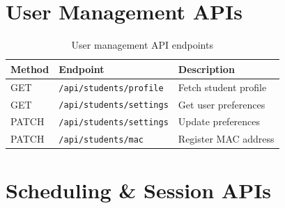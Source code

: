 \section{User Management APIs}

\begin{table}[!ht]
    \centering
    \begin{tabular}{|l|l|p{6.5cm}|}
    \hline
    \textbf{Method} & \textbf{Endpoint} & \textbf{Description} \\ \hline
    GET   & \texttt{/api/students/profile}  & Fetch student profile \\
    GET   & \texttt{/api/students/settings} & Get user preferences \\
    PATCH & \texttt{/api/students/settings} & Update preferences \\
    PATCH & \texttt{/api/students/mac}      & Register MAC address \\ \hline
    \end{tabular}
    \caption{User management API endpoints}
    \label{tab:api_user}
\end{table}

\section{Scheduling \& Session APIs}

